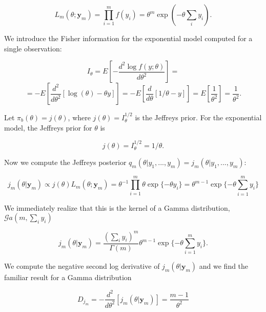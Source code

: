 \documentclass{statsoc}
\begin{document}
\begin{equation}
L_{m}(\theta; \bm{y}_{m})=\prod_{i=1}^{m} f(y_{i})= \theta^{m} \exp(-\theta \sum_{i} y_{i}).
\label{eq:exponential_lik}
\end{equation} 

We introduce the Fisher information for the exponential model computed for a single observation:

$$I_{\theta}=E \left[- \frac{d^{2} \log f(y; \theta)}{d \theta^{2}} \right]=$$
$$= -E \left[ \frac{d^{2}}{d \theta^{2}} \left[  \log(\theta)-\theta y\right] \right]=-E \left[\frac{d}{d \theta}[1/{\theta}-y ] \right]=E \left[ \frac{1}{\theta^{2}} \right]= \frac{1}{\theta^{2}}.$$

Let $\pi_{b}(\theta)=j(\theta)$, where $j(\theta)= I^{1/2}_{\theta}$ is the Jeffreys prior. 
For the exponential model, the Jeffreys prior for $\theta$ is

\begin{equation}
j(\theta)=I^{1/2}_{\theta}=1/\theta.
\label{eq:Jeffreys_exp}
\end{equation}

Now we compute the Jeffreys posterior $q_{m}(\theta|y_{1},...,y_{m})= j_{m}(\theta|y_{1},...,y_{m} )$:

\begin{equation}
j_{m}( \theta| \bm{y}_{m}) \propto j(\theta) L_{m}(\theta; \bm{y}_{m})
=\theta^{-1}\prod_{i=1}^{m}\theta\exp \{-\theta y_{i} \}
=\theta^{m-1} \exp \{ -\theta \sum_{i=1}^{m} y_{i}  \}
\label{eq:Jeffreys_post}
\end{equation}

We immediately realize that this is the kernel of a Gamma distribution, $\mathcal{G}a(m, \sum_{i} y_{i})$

$$ j_{m}(  \theta |\bm{y}_{m} )= \frac{(\sum_{i}y_{i})^{m}}{\Gamma(m)} \theta^{m-1} \exp \{ -\theta \sum_{i=1}^{m} y_{i}  \}. $$

 We compute the negative second log derivative of $j_{m}(\theta |\bm{y}_{m})$ and we find the familiar result for a Gamma distribution

\begin{equation}
D_{j_{m}}=-\frac{d^{2}}{d \theta^{2}}\left[j_{m}( \theta| \bm{y}_{m})  \right]= \frac{m-1}{\theta^{2}}
\label{eq:Morita_Jeffreys}
\end{equation}
\end{document}

